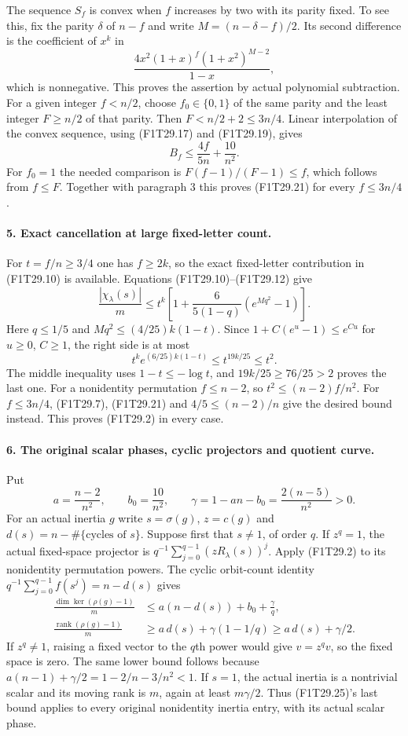 The sequence $S_f$ is convex when $f$ increases by two
with its parity fixed. To see this, fix the parity
$\delta$ of $n-f$ and write $M=(n-\delta-f)/2$.
Its second difference is the coefficient of $x^k$ in
\[
 \frac{4x^2(1+x)^f(1+x^2)^{M-2}}{1-x},
 \tag{F1T29.20}
\]
which is nonnegative. This proves the assertion by
actual polynomial subtraction.
For a given integer $f<n/2$, choose $f_0\in\{0,1\}$
of the same parity and the least integer $F\ge n/2$
of that parity. Then $F<n/2+2\le3n/4$.
Linear interpolation of the convex sequence, using
(F1T29.17) and (F1T29.19), gives
\[
 B_f\le \frac{4f}{5n}+\frac{10}{n^2}.
 \tag{F1T29.21}
\]
For $f_0=1$ the needed comparison is
$F(f-1)/(F-1)\le f$, which follows from $f\le F$.
Together with paragraph 3 this proves (F1T29.21)
for every $f\le3n/4$.

\paragraph{5. Exact cancellation at large fixed-letter count.}
For $t=f/n\ge3/4$ one has $f\ge2k$, so the exact
fixed-letter contribution in (F1T29.10) is available.
Equations (F1T29.10)--(F1T29.12) give
\[
 \frac{|\chi_\lambda(s)|}{m}
       \le t^k\left[1+\frac{6}{5(1-q)}
                                      (e^{Mq^2}-1)\right].
 \tag{F1T29.22}
\]
Here $q\le1/5$ and
$Mq^2\le(4/25)k(1-t)$. Since
$1+C(e^u-1)\le e^{Cu}$ for $u\ge0$, $C\ge1$,
the right side is at most
\[
 t^k e^{(6/25)k(1-t)}
       \le t^{19k/25}\le t^2.
 \tag{F1T29.23}
\]
The middle inequality uses $1-t\le-\log t$, and
$19k/25\ge76/25>2$ proves the last one.
For a nonidentity permutation $f\le n-2$, so
$t^2\le (n-2)f/n^2$.
For $f\le3n/4$, (F1T29.7), (F1T29.21) and
$4/5\le(n-2)/n$ give the desired bound instead.
This proves (F1T29.2) in every case.

\paragraph{6. The original scalar phases, cyclic projectors and quotient curve.}
Put
\[
       a=\frac{n-2}{n^2},\qquad b_0=\frac{10}{n^2},
       \qquad \gamma=1-an-b_0=\frac{2(n-5)}{n^2}>0.
 \tag{F1T29.24}
\]
For an actual inertia $g$ write $s=\sigma(g)$, $z=c(g)$
and $d(s)=n-\#\{\text{cycles of }s\}$.
Suppose first that $s\ne1$, of order $q$.
If $z^q=1$, the actual fixed-space projector is
$q^{-1}\sum_{j=0}^{q-1}(zR_\lambda(s))^j$.
Apply (F1T29.2) to its nonidentity permutation powers.
The cyclic orbit-count identity
$q^{-1}\sum_{j=0}^{q-1}f(s^j)=n-d(s)$ gives
\[
 \begin{split}
 \frac{\dim\ker(\rho(g)-1)}m
    &\le a(n-d(s))+b_0+\frac{\gamma}{q},\\
 \frac{\operatorname{rank}(\rho(g)-1)}m
    &\ge a\,d(s)+\gamma(1-1/q)
     \ge a\,d(s)+\gamma/2 .
 \end{split}
 \tag{F1T29.25}
\]
If $z^q\ne1$, raising a fixed vector to the $q$th power
would give $v=z^qv$, so the fixed space is zero.
The same lower bound follows because
$a(n-1)+\gamma/2=1-2/n-3/n^2<1$.
If $s=1$, the actual inertia is a nontrivial scalar
and its moving rank is $m$, again at least $m\gamma/2$.
Thus (F1T29.25)'s last bound applies to every original
nonidentity inertia entry, with its actual scalar phase.

